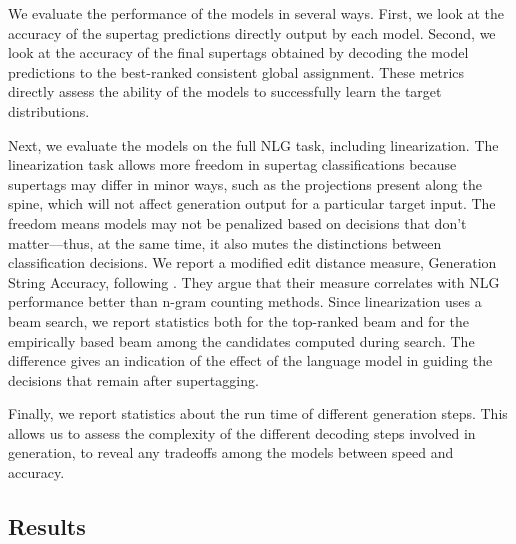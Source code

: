 \documentclass[11pt]{article}
\begin{document}
We evaluate the performance of the models in several ways.  First, we
look at the accuracy of the supertag predictions directly output by
each model.  Second, we look at the accuracy of the final supertags
obtained by decoding the model predictions to the best-ranked
consistent global assignment.  These metrics directly assess the
ability of the models to successfully learn the target distributions.

Next, we evaluate the models on the full NLG task, including
linearization.  
%
The linearization task allows more freedom in supertag
classifications because supertags may differ in minor ways, such as
the projections present along the spine, which will not affect
generation output for a particular target input.
%
The freedom means models may not be penalized based on decisions that
don't matter---thus, at the same time, it also mutes the
distinctions between classification decisions.
%
We report a modified edit distance measure, Generation String Accuracy, following \cite{bangalore2000evaluation}.
%
They argue that their measure correlates with NLG performance better
than n-gram counting methods.
%
Since linearization uses a beam search, we report statistics both for
the top-ranked beam and for the empirically based beam among the
candidates computed during search.
%
The difference gives an indication of the effect of the language model
in guiding the decisions that remain after supertagging.

Finally, we report statistics about the run time of different
generation steps.
%
This allows us to assess the complexity of the different decoding
steps involved in generation, to reveal any tradeoffs among the models
between speed and accuracy.

\subsection{Results}
\label{sec:results}
\end{document}
